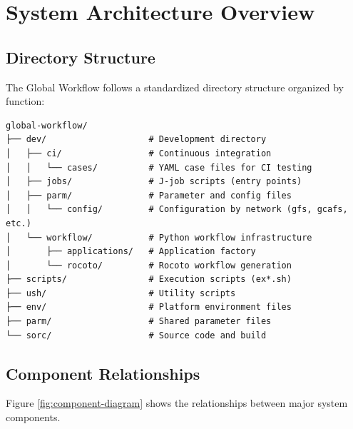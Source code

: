 \documentclass[11pt,letterpaper]{article}
\begin{document}

\section{System Architecture Overview}

\subsection{Directory Structure}

The Global Workflow follows a standardized directory structure organized by function:

\begin{lstlisting}[style=bashstyle, title=Global Workflow Directory Structure]
global-workflow/
├── dev/                    # Development directory
│   ├── ci/                 # Continuous integration
│   │   └── cases/          # YAML case files for CI testing
│   ├── jobs/               # J-job scripts (entry points)
│   ├── parm/               # Parameter and config files
│   │   └── config/         # Configuration by network (gfs, gcafs, etc.)
│   └── workflow/           # Python workflow infrastructure
│       ├── applications/   # Application factory
│       └── rocoto/         # Rocoto workflow generation
├── scripts/                # Execution scripts (ex*.sh)
├── ush/                    # Utility scripts
├── env/                    # Platform environment files
├── parm/                   # Shared parameter files
└── sorc/                   # Source code and build
\end{lstlisting}

\subsection{Component Relationships}

Figure \ref{fig:component-diagram} shows the relationships between major system components.
\end{document}

